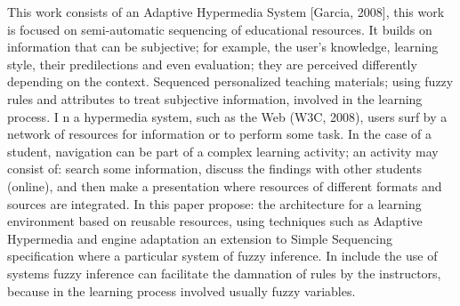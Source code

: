 This work consists of an Adaptive Hypermedia System [Garcia, 2008], this work is focused on semi-automatic sequencing of educational resources. It builds on information that can be subjective; for example, the user's knowledge, learning style, their predilections and even evaluation; they are perceived differently depending on the context. Sequenced personalized teaching materials; using fuzzy rules and attributes to treat subjective information, involved in the learning process. I n a hypermedia system, such as the Web (W3C, 2008), users surf by  a network of resources for information or to perform some task. In the case of a student, navigation can be part of a complex learning activity; an activity may consist of: search some information, discuss the findings with other students (online), and then make a presentation where resources of different formats and sources are integrated.
In this paper propose: the architecture for a learning environment based on reusable resources, using techniques such as Adaptive Hypermedia and engine adaptation an extension to Simple Sequencing specification where a particular system of fuzzy inference. In include the use of systems fuzzy inference can facilitate the damnation of rules by the instructors, because in the learning process involved usually fuzzy variables.
